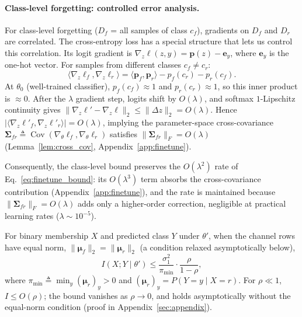 \documentclass[smallextended]{svjour3}       %
\newcommand{\coloneqq}{\triangleq}
\begin{document}
\paragraph{Class-level forgetting: controlled error analysis.}
For class-level forgetting ($D_f$ = all samples of class $c_f$), gradients on $D_f$ and $D_r$ are correlated. The cross-entropy loss has a special structure that lets us control this correlation. Its logit gradient is $\nabla_z\ell(z,y)=\mathbf{p}(z)-\mathbf{e}_y$, where $\mathbf{e}_y$ is the one-hot vector. For samples from different classes $c_f\neq c_r$:
\begin{equation}
\langle\nabla_z\ell_f,\nabla_z\ell_r\rangle = \langle\mathbf{p}_f,\mathbf{p}_r\rangle - p_f(c_r) - p_r(c_f).
\end{equation}
At $\theta_0$ (well-trained classifier), $p_f(c_f){\approx}1$ and $p_r(c_r){\approx}1$, so this inner product is $\approx0$. After the $\lambda$ gradient step, logits shift by $O(\lambda)$, and softmax $1$-Lipschitz continuity gives $\|\nabla_z\ell' - \nabla_z\ell\|_2\le\|\Delta z\|_2 = O(\lambda)$. Hence $|\langle\nabla_z\ell'_f,\nabla_z\ell'_r\rangle| = O(\lambda)$, implying the parameter-space cross-covariance $\boldsymbol{\Sigma}_{fr} \coloneqq \operatorname{Cov}(\nabla_\theta\ell_f,\nabla_\theta\ell_r)$ satisfies $\|\boldsymbol{\Sigma}_{fr}\|_F = O(\lambda)$ (Lemma~\ref{lem:cross_cov}, Appendix~\ref{app:finetune}).

Consequently, the class-level bound preserves the $O(\lambda^2)$ rate of Eq.~\eqref{eq:finetune_bound}: its $O(\lambda^3)$ term absorbs the cross-covariance contribution (Appendix~\ref{app:finetune}), and the rate is maintained because $\|\boldsymbol{\Sigma}_{fr}\|_F = O(\lambda)$ adds only a higher-order correction, negligible at practical learning rates ($\lambda{\sim}10^{-5}$).


\begin{theorem}
\label{thm:mi_bound}
For binary membership $X$ and predicted class $Y$ under $\theta'$, when the channel rows have equal norm, $\|\boldsymbol{\mu}_f\|_2=\|\boldsymbol{\mu}_r\|_2$ (a condition relaxed asymptotically below),
\begin{equation}
I(X; Y \mid \theta') \le \frac{\sigma_1^2}{\pi_{\min}}\cdot\frac{\rho}{1-\rho},
\end{equation}
where $\pi_{\min} \coloneqq \min_y (\boldsymbol{\mu}_r)_y > 0$ and $(\boldsymbol{\mu}_r)_y=P(Y{=}y\mid X{=}r)$. For $\rho\ll 1$, $I \le O(\rho)$; the bound vanishes as $\rho\to0$, and holds asymptotically without the equal-norm condition (proof in Appendix~\ref{sec:appendix}).
\end{theorem}
\end{document}
